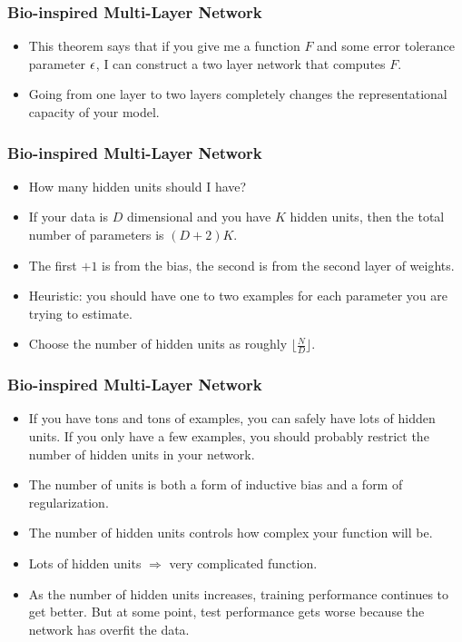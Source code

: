\documentclass[trans]{beamer}
\begin{document}
\begin{frame}
  \frametitle{Bio-inspired Multi-Layer Network}
\begin{itemize}
\item
This theorem  says that if you give
me a function $F$ and some error tolerance parameter $\epsilon$, I can
construct a two layer network that computes $F$. 
\item Going from one layer to two layers completely changes the
representational capacity of your model.
\end{itemize}
\end{frame}

\begin{frame}
  \frametitle{Bio-inspired Multi-Layer Network}
\begin{itemize}
\item
How many
hidden units should I have?  
\item If your data is $D$ dimensional and you
have $K$ hidden units, then the total number of parameters is
$(D+2)K$.
\item   The first $+1$ is from the bias, the second is from the
second layer of weights.
\item   Heuristic: you
should have one to two examples for each parameter you are trying to
estimate.
\item Choose the number of hidden
units as roughly $\lfloor \frac N D \rfloor$.  
\end{itemize}
\end{frame}

\begin{frame}
  \frametitle{Bio-inspired Multi-Layer Network}
\begin{itemize}
\item
If you
have tons and tons of examples, you can safely have lots of hidden
units.  If you only have a few examples, you should probably restrict
the number of hidden units in your network.
\item 
The number of units is both a form of inductive bias and a form of
regularization. 
\item The number of hidden units controls how
complex your function will be.
\item  Lots of hidden units $\Rightarrow$
very complicated function. 
\item  As the number of hidden units increases, training performance continues
to get better.  But at some point, test performance gets worse because
the network has overfit the data.
\end{itemize}
\end{frame}
\end{document}
